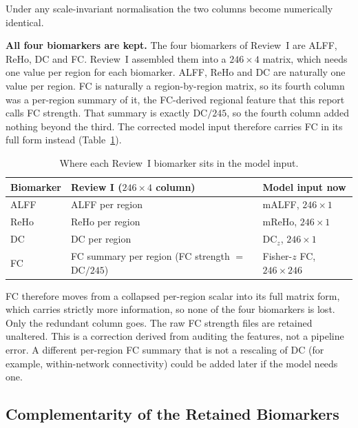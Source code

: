\documentclass{ssnreview}
\begin{document}
Under any scale-invariant normalisation the two columns become numerically identical.

\textbf{All four biomarkers are kept.} The four biomarkers of Review~I are ALFF, ReHo,
DC and FC. Review~I assembled them into a $246\times4$ matrix, which needs one value per
region for each biomarker. ALFF, ReHo and DC are naturally one value per region. FC is
naturally a region-by-region matrix, so its fourth column was a per-region summary of
it, the FC-derived regional feature that this report calls FC strength. That summary
is exactly DC$/245$, so the fourth column added nothing beyond the third. The corrected
model input therefore carries FC in its full form instead (Table~\ref{tab:fourbio}).

\begin{table}[!htbp]
\centering
\caption{Where each Review~I biomarker sits in the model input.}
\label{tab:fourbio}
\small
\begin{tabularx}{\textwidth}{@{}lXl@{}}
\toprule
\textbf{Biomarker} & \textbf{Review I ($246\times4$ column)} & \textbf{Model input now} \\
\midrule
ALFF & ALFF per region & mALFF, $246\times1$ \\
ReHo & ReHo per region & mReHo, $246\times1$ \\
DC & DC per region & DC$_z$, $246\times1$ \\
FC & FC summary per region (FC strength $=$ DC$/245$) & Fisher-$z$ FC, $246\times246$ \\
\bottomrule
\end{tabularx}
\end{table}

FC therefore moves from a collapsed per-region scalar into its full matrix form, which
carries strictly more information, so none of the four biomarkers is lost. Only the
redundant column goes. The raw FC strength files are retained unaltered. This is a
correction derived from auditing the features, not a pipeline error. A different
per-region FC summary that is not a rescaling of DC (for example, within-network
connectivity) could be added later if the model needs one.

\subsection{Complementarity of the Retained Biomarkers}\label{sec:complement}
\end{document}
